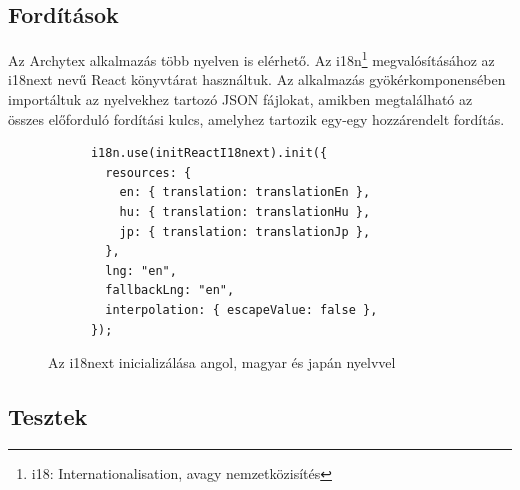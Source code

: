 \subsection{Fordítások}
Az Archytex alkalmazás több nyelven is elérhető. Az i18n\footnote{i18: Internationalisation, avagy nemzetközisítés}  megvalósításához az i18next nevű React könyvtárat használtuk. Az alkalmazás gyökérkomponensében importáltuk az nyelvekhez tartozó JSON fájlokat, amikben megtalálható az összes előforduló fordítási kulcs, amelyhez tartozik egy-egy hozzárendelt fordítás.

\begin{figure}[h]
  \centering
  \begin{minipage}{.7\textwidth}
    \centering
    \begin{lstlisting}
      i18n.use(initReactI18next).init({
        resources: {
          en: { translation: translationEn },
          hu: { translation: translationHu },
          jp: { translation: translationJp },
        },
        lng: "en",
        fallbackLng: "en",
        interpolation: { escapeValue: false },
      });\end{lstlisting}
  \end{minipage}
  \caption{Az i18next inicializálása angol, magyar és japán nyelvvel}
\end{figure}


\subsection{Tesztek}
